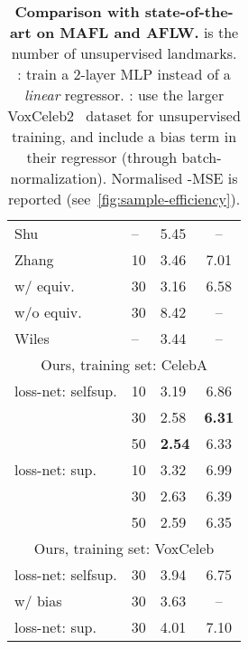 \documentclass{article}
\begin{document}
\begin{wraptable}{r}{5.9cm}
\begin{tabular}{@{}lllc@{}}
Shu~~\cite{shu2018deforming}         & {--} & 5.45       & {--}                     \\
Zhang~\cite{zhang2018unsupervised}            & 10   & 3.46       & 7.01                     \\
\quad w/ equiv.                               & 30   & 3.16       & 6.58                     \\
\quad w/o equiv.                              & 30   & 8.42       & {--}                     \\
Wiles~~\cite{Wiles18a}              & {--} & 3.44       & {--}                     \\ \midrule
\multicolumn{4}{c}{Ours, training set: CelebA}                                               \\
loss-net: selfsup.                            & 10   & 3.19       & 6.86                     \\
                                              & 30   & 2.58       & {\bf 6.31}               \\
                                              & 50   & {\bf 2.54} & 6.33                     \\
loss-net: sup.                                & 10   & 3.32       & 6.99                     \\
                                              & 30   & 2.63       & 6.39                     \\
                                              & 50   & 2.59       & 6.35                     \\ \midrule
\multicolumn{4}{c}{Ours, training set: VoxCeleb}                                             \\
loss-net: selfsup.                            & 30   & 3.94       & {6.75}                     \\
\quad w/ bias                                 & 30   & 3.63       & {--}                     \\
loss-net: sup.                                & 30   & 4.01       & 7.10                     \\ \bottomrule
\end{tabular}
\caption{{\bf Comparison with state-of-the-art on MAFL and AFLW.}  is the number of unsupervised landmarks. : train a 2-layer MLP instead of a \emph{linear} regressor. : use the larger VoxCeleb2~\cite{Chung18a} dataset for unsupervised training, and include a bias term in their regressor (through batch-normalization). Normalised -MSE is reported (see~\cref{fig:sample-efficiency}).}\label{tab:face-sota}
\vspace{-9mm}
\end{wraptable}
\end{document}

